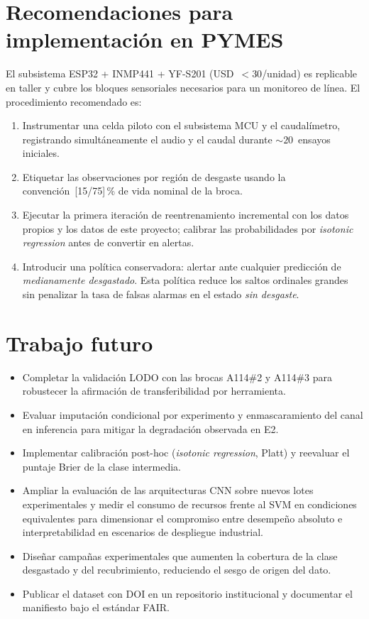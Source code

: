 \documentclass[12pt, letterpaper]{report}
\begin{document}
\section{Recomendaciones para implementación en PYMES}

El subsistema ESP32 + INMP441 + YF-S201 (USD~$<30$/unidad) es
replicable en taller y cubre los bloques sensoriales necesarios para un
monitoreo de línea. El procedimiento recomendado es:

\begin{enumerate}
\item Instrumentar una celda piloto con el subsistema MCU y el
      caudalímetro, registrando simultáneamente el audio y el caudal
      durante $\sim\!20$~ensayos iniciales.
\item Etiquetar las observaciones por región de desgaste usando la
      convención~[15/75]\,\% de vida nominal de la broca.
\item Ejecutar la primera iteración de reentrenamiento incremental
      con los datos propios y los datos de este proyecto; calibrar las
      probabilidades por \emph{isotonic regression} antes de convertir
      en alertas.
\item Introducir una política conservadora: alertar ante cualquier
      predicción de \emph{medianamente desgastado}. Esta política
      reduce los saltos ordinales grandes sin penalizar la tasa de
      falsas alarmas en el estado \emph{sin desgaste}.
\end{enumerate}

\section{Trabajo futuro}

\begin{itemize}
\item Completar la validación LODO con las brocas A114\#2 y A114\#3
      para robustecer la afirmación de transferibilidad por
      herramienta.
\item Evaluar imputación condicional por experimento y enmascaramiento
      del canal en inferencia para mitigar la degradación observada en
      E2.
\item Implementar calibración post-hoc (\emph{isotonic regression},
      Platt) y reevaluar el puntaje Brier de la clase intermedia.
\item Ampliar la evaluación de las arquitecturas CNN sobre nuevos
      lotes experimentales y medir el consumo de recursos frente al
      SVM en condiciones equivalentes para dimensionar el compromiso
      entre desempeño absoluto e interpretabilidad en escenarios de
      despliegue industrial.
\item Diseñar campañas experimentales que aumenten la cobertura de la
      clase desgastado y del recubrimiento, reduciendo el sesgo de
      origen del dato.
\item Publicar el dataset con DOI en un repositorio institucional y
      documentar el manifiesto bajo el estándar FAIR.
\end{itemize}
\end{document}
